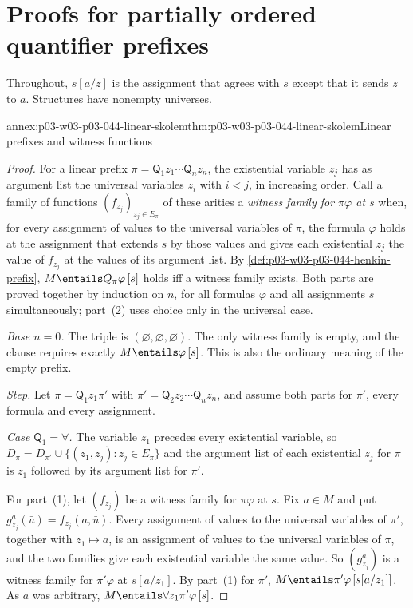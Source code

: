 \section{Proofs for partially ordered quantifier prefixes}
\label{sec:annex-p03-w03-p03-044-po-prefixes}

Throughout, \(s[a/z]\) is the assignment that agrees with \(s\) except that
it sends \(z\) to \(a\).  Structures have nonempty universes.

\begin{annexitem}{annex:p03-w03-p03-044-linear-skolem}{thm:p03-w03-p03-044-linear-skolem}{Linear prefixes and witness functions}
\begin{proof}
For a linear prefix \(\pi=\mathsf Q_1z_1\cdots\mathsf Q_nz_n\), the
existential variable \(z_j\) has as argument list the universal variables
\(z_i\) with \(i<j\), in increasing order.  Call a family of functions
\((f_{z_j})_{z_j\in E_\pi}\) of these arities a \emph{witness family for
\(\pi\varphi\) at \(s\)} when, for every assignment of values to the
universal variables of \(\pi\), the formula \(\varphi\) holds at the
assignment that extends \(s\) by those values and gives each existential
\(z_j\) the value of \(f_{z_j}\) at the values of its argument list.  By
\cref{def:p03-w03-p03-044-henkin-prefix}, \(M\entails Q_\pi\varphi\,[s]\)
holds iff a witness family exists.  Both parts are proved together by
induction on \(n\), for all formulas \(\varphi\) and all assignments \(s\)
simultaneously; part~(2) uses choice only in the universal case.

\emph{Base \(n=0\).}  The triple is
\((\varnothing,\varnothing,\varnothing)\).  The only witness family is
empty, and the clause requires exactly \(M\entails\varphi\,[s]\).  This is
also the ordinary meaning of the empty prefix.

\emph{Step.}  Let \(\pi=\mathsf Q_1z_1\pi'\) with
\(\pi'=\mathsf Q_2z_2\cdots\mathsf Q_nz_n\), and assume both parts for
\(\pi'\), every formula and every assignment.

\emph{Case \(\mathsf Q_1=\forall\).}  The variable \(z_1\) precedes every
existential variable, so \(D_\pi=D_{\pi'}\cup\{(z_1,z_j):z_j\in E_\pi\}\)
and the argument list of each existential \(z_j\) for \(\pi\) is \(z_1\)
followed by its argument list for \(\pi'\).

For part~(1), let \((f_{z_j})\) be a witness family for \(\pi\varphi\) at
\(s\).  Fix \(a\in M\) and put \(g^a_{z_j}(\bar u)=f_{z_j}(a,\bar u)\).
Every assignment of values to the universal variables of \(\pi'\), together
with \(z_1\mapsto a\), is an assignment of values to the universal variables
of \(\pi\), and the two families give each existential variable the same
value.  So \((g^a_{z_j})\) is a witness family for \(\pi'\varphi\) at
\(s[a/z_1]\).  By part~(1) for \(\pi'\),
\(M\entails\pi'\varphi\,[s[a/z_1]]\).  As \(a\) was arbitrary,
\(M\entails\forall z_1\pi'\varphi\,[s]\).


\end{proof}
\end{annexitem}
